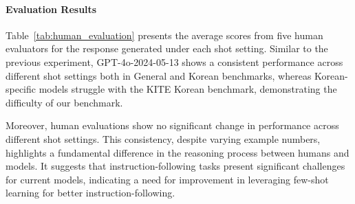     \paragraph{Evaluation Results}
    Table~\ref{tab:human_evaluation} presents the average scores from five human evaluators for the response generated under each shot setting. Similar to the previous experiment, GPT-4o-2024-05-13 shows a consistent performance across different shot settings both in General and Korean benchmarks, whereas Korean-specific models struggle with the KITE Korean benchmark, demonstrating the difficulty of our benchmark.

    Moreover, human evaluations show no significant change in performance across different shot settings. This consistency, despite varying example numbers, highlights a fundamental difference in the reasoning process between humans and models. It suggests that instruction-following tasks present significant challenges for current models, indicating a need for improvement in leveraging few-shot learning for better instruction-following.

